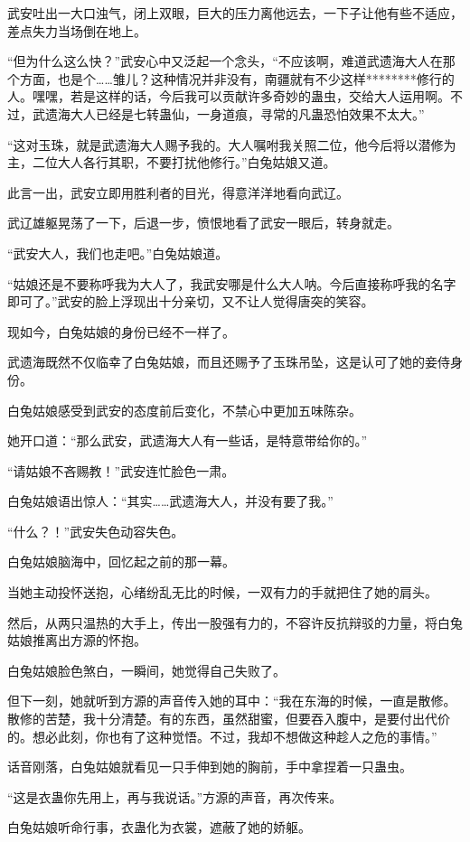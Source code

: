 \begin{this_body}
武安吐出一大口浊气，闭上双眼，巨大的压力离他远去，一下子让他有些不适应，差点失力当场倒在地上。

“但为什么这么快？”武安心中又泛起一个念头，“不应该啊，难道武遗海大人在那个方面，也是个……雏儿？这种情况并非没有，南疆就有不少这样********修行的人。嘿嘿，若是这样的话，今后我可以贡献许多奇妙的蛊虫，交给大人运用啊。不过，武遗海大人已经是七转蛊仙，一身道痕，寻常的凡蛊恐怕效果不太大。”

“这对玉珠，就是武遗海大人赐予我的。大人嘱咐我关照二位，他今后将以潜修为主，二位大人各行其职，不要打扰他修行。”白兔姑娘又道。

此言一出，武安立即用胜利者的目光，得意洋洋地看向武辽。

武辽雄躯晃荡了一下，后退一步，愤恨地看了武安一眼后，转身就走。

“武安大人，我们也走吧。”白兔姑娘道。

“姑娘还是不要称呼我为大人了，我武安哪是什么大人呐。今后直接称呼我的名字即可了。”武安的脸上浮现出十分亲切，又不让人觉得唐突的笑容。

现如今，白兔姑娘的身份已经不一样了。

武遗海既然不仅临幸了白兔姑娘，而且还赐予了玉珠吊坠，这是认可了她的妾侍身份。

白兔姑娘感受到武安的态度前后变化，不禁心中更加五味陈杂。

她开口道：“那么武安，武遗海大人有一些话，是特意带给你的。”

“请姑娘不吝赐教！”武安连忙脸色一肃。

白兔姑娘语出惊人：“其实……武遗海大人，并没有要了我。”

“什么？！”武安失色动容失色。

白兔姑娘脑海中，回忆起之前的那一幕。

当她主动投怀送抱，心绪纷乱无比的时候，一双有力的手就把住了她的肩头。

然后，从两只温热的大手上，传出一股强有力的，不容许反抗辩驳的力量，将白兔姑娘推离出方源的怀抱。

白兔姑娘脸色煞白，一瞬间，她觉得自己失败了。

但下一刻，她就听到方源的声音传入她的耳中：“我在东海的时候，一直是散修。散修的苦楚，我十分清楚。有的东西，虽然甜蜜，但要吞入腹中，是要付出代价的。想必此刻，你也有了这种觉悟。不过，我却不想做这种趁人之危的事情。”

话音刚落，白兔姑娘就看见一只手伸到她的胸前，手中拿捏着一只蛊虫。

“这是衣蛊你先用上，再与我说话。”方源的声音，再次传来。

白兔姑娘听命行事，衣蛊化为衣裳，遮蔽了她的娇躯。


\end{this_body}
